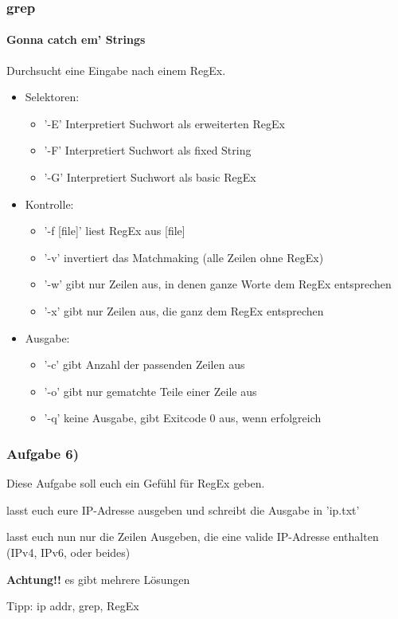 \documentclass[12pt,utf8]{beamer}
\begin{document}
\begin{frame}
\frametitle{grep}
\framesubtitle{Gonna catch em' Strings}
Durchsucht eine Eingabe nach einem RegEx.
\begin{itemize}[<+->]
	\item Selektoren:
	\begin{itemize}[<+->]
		\item '-E' Interpretiert Suchwort als erweiterten RegEx
		\item '-F' Interpretiert Suchwort als fixed String
		\item '-G' Interpretiert Suchwort als basic RegEx
	\end{itemize}
	\item Kontrolle:
	\begin{itemize}
		\item '-f [file]' liest RegEx aus [file]
		\item '-v' invertiert das Matchmaking (alle Zeilen ohne RegEx)
		\item '-w' gibt nur Zeilen aus, in denen ganze Worte dem RegEx entsprechen
		\item '-x' gibt nur Zeilen aus, die ganz dem RegEx entsprechen
	\end{itemize}
	\item Ausgabe:
	\begin{itemize}
		\item '-c' gibt Anzahl der passenden Zeilen aus
		\item '-o' gibt nur gematchte Teile einer Zeile aus
		\item '-q' keine Ausgabe, gibt Exitcode 0 aus, wenn erfolgreich
	\end{itemize}
\end{itemize}
\end{frame}

\begin{frame}
\frametitle{Aufgabe 6)}
Diese Aufgabe soll euch ein Gefühl für RegEx geben.
\begin{itemize}
{\footnotesize
	\item lasst euch eure IP-Adresse ausgeben und schreibt die Ausgabe in 'ip.txt'
	\item lasst euch nun nur die Zeilen Ausgeben, die eine valide IP-Adresse enthalten (IPv4, IPv6, oder beides)
	\item \textbf{Achtung!!} es gibt mehrere Lösungen
	}
\end{itemize}
{\scriptsize Tipp: ip addr, grep, RegEx}
\end{frame}
\end{document}

